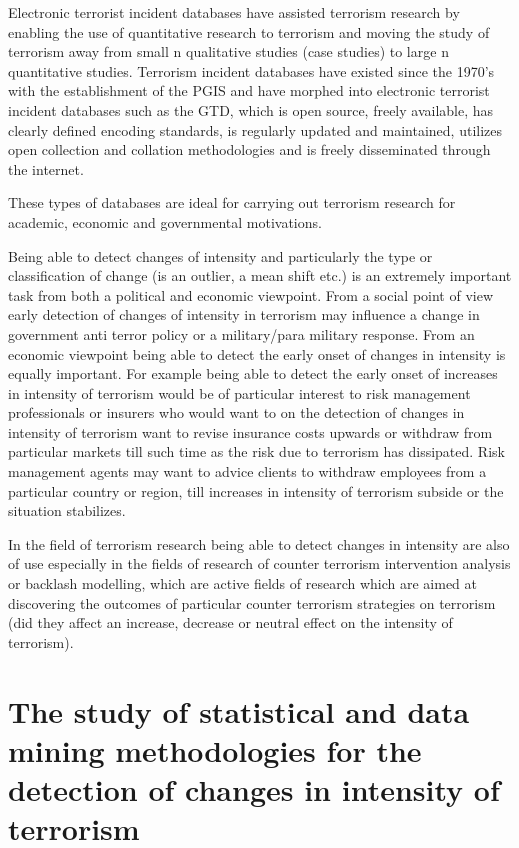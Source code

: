 Electronic terrorist incident databases have assisted terrorism research by enabling the use of quantitative research to terrorism and moving the study of terrorism away from small n qualitative studies (case studies) to large n quantitative studies. Terrorism incident databases have existed since the 1970's with the establishment of the PGIS \citep{enders2011domestic} and have morphed into electronic terrorist incident databases such as the GTD, which is open source, freely available, has clearly defined encoding standards, is regularly updated and maintained, utilizes open collection and collation methodologies and is freely disseminated through the internet. 

These types of databases are ideal for carrying out terrorism research for academic, economic and governmental motivations.

Being able to detect changes of intensity and particularly the type or classification of change (is an outlier, a mean shift etc.) is an extremely important task from both a political and economic viewpoint. From a social point of view early detection of changes of intensity in terrorism may influence a change in government anti terror policy or a military/para military response. From an economic viewpoint being able to detect the early onset of changes in intensity is equally important. For example being able to detect the early onset of increases in intensity of terrorism would be of particular interest to risk management professionals or insurers who would want to on the detection of changes in intensity of terrorism want to revise insurance costs upwards or withdraw from particular markets till such time as the risk due to terrorism has dissipated. Risk management agents may want to advice clients to withdraw employees from a particular country or region, till increases in intensity of terrorism subside or the situation stabilizes. 

In the field of terrorism research being able to detect changes in intensity are also of use especially in the fields of research of counter terrorism intervention analysis or backlash modelling, which are active fields of research which are aimed at discovering the outcomes of particular counter terrorism strategies on terrorism (did they affect an increase, decrease or neutral effect on the intensity of terrorism). 

\section{The study of statistical and data mining methodologies for the detection of changes in intensity of terrorism}

